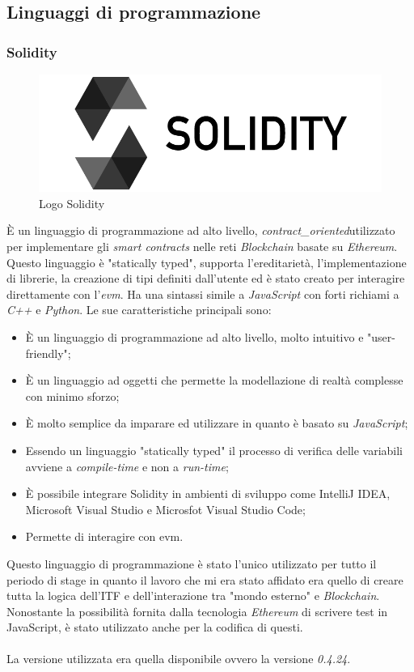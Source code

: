 \subsection{Linguaggi di programmazione}
\subsubsection{Solidity}
\begin{figure}[h]
	\centering
	\includegraphics[scale=0.25]{immagini/solidity}
	\caption{Logo Solidity}
\end{figure}
È un linguaggio di programmazione ad alto livello, \emph{\gls{contract_oriented}}\glsfirstoccur utilizzato per implementare gli \textit{smart contracts} nelle reti \textit{Blockchain} basate su \textit{Ethereum}.
Questo linguaggio è "statically typed", supporta l'ereditarietà, l'implementazione di librerie, la creazione di tipi definiti dall'utente ed è stato creato per interagire direttamente con l'\emph{\gls{evm}}\glsfirstoccur. 
Ha una sintassi simile a \textit{JavaScript} con forti richiami a \textit{C++} e \textit{Python}\cite{solidity}.
Le sue caratteristiche principali sono\cite{solidity}:
\begin{itemize}
	\item È un linguaggio di programmazione ad alto livello, molto intuitivo e "user-friendly";
	\item È un linguaggio ad oggetti che permette la modellazione di realtà complesse con minimo sforzo;
	\item È molto semplice da imparare ed utilizzare in quanto è basato su \textit{JavaScript};
	\item Essendo un linguaggio "statically typed" il processo di verifica delle variabili avviene a \textit{compile-time} e non a \textit{run-time};
	\item È possibile integrare Solidity in ambienti di sviluppo come IntelliJ IDEA, Microsoft Visual Studio e Microsfot Visual Studio Code;
	\item Permette di interagire con \gls{evm}.
\end{itemize}
Questo linguaggio di programmazione è stato l'unico utilizzato per tutto il periodo di stage in quanto il lavoro che mi era stato affidato era quello di creare tutta la logica dell'\gls{ITF} e dell'interazione tra "mondo esterno" e \textit{Blockchain}.\\
Nonostante la possibilità fornita dalla tecnologia \textit{Ethereum} di scrivere test in JavaScript, è stato utilizzato anche per la codifica di questi.\\\\
La versione utilizzata era quella disponibile ovvero la versione \textit{0.4.24}.